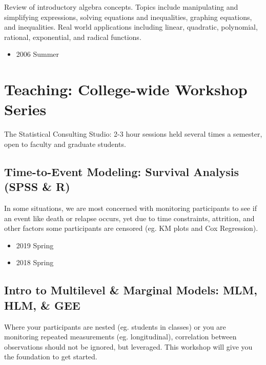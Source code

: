 \documentclass[11pt,a4paper,]{moderncv}
\providecommand{\tightlist}{%
	\setlength{\itemsep}{0pt}\setlength{\parskip}{0pt}}
\begin{document}
Review of introductory algebra concepts. Topics include manipulating and
simplifying expressions, solving equations and inequalities, graphing
equations, and inequalities. Real world applications including linear,
quadratic, polynomial, rational, exponential, and radical functions.

\begin{itemize}
\tightlist
\item
  2006 Summer
\end{itemize}

\clearpage

\hypertarget{teaching-college-wide-workshop-series}{%
\section{Teaching: College-wide Workshop
Series}\label{teaching-college-wide-workshop-series}}

The Statistical Consulting Studio: 2-3 hour sessions held several times
a semester, open to faculty and graduate students.

\hypertarget{time-to-event-modeling-survival-analysis-spss-r}{%
\subsection{Time-to-Event Modeling: Survival Analysis (SPSS \&
R)}\label{time-to-event-modeling-survival-analysis-spss-r}}

In some situations, we are most concerned with monitoring participants
to see if an event like death or relapse occurs, yet due to time
constraints, attrition, and other factors some participants are censored
(eg. KM plots and Cox Regression).

\begin{itemize}
\tightlist
\item
  2019 Spring
\item
  2018 Spring
\end{itemize}

\hypertarget{intro-to-multilevel-marginal-models-mlm-hlm-gee}{%
\subsection{Intro to Multilevel \& Marginal Models: MLM, HLM, \&
GEE}\label{intro-to-multilevel-marginal-models-mlm-hlm-gee}}

Where your participants are nested (eg. students in classes) or you are
monitoring repeated measurements (eg. longitudinal), correlation between
observations should not be ignored, but leveraged. This workshop will
give you the foundation to get started.
\end{document}
